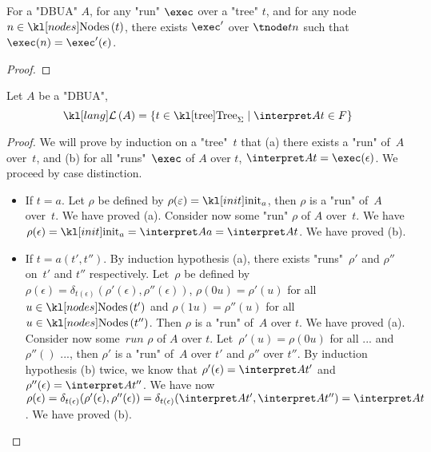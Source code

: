 \documentclass{article}
\begin{document}
\begin{lemma}\label{lem:exec-sub}
	For a "DBUA" $A$, for any "run" $\exec$ over a "tree" $t$, and for any node $n \in \nodes t$, there exists $\exec'$ over
	$\tnode t n$ such that $\exec (n) = \exec'(\epsilon)$.
\end{lemma}

\begin{proof}
	\todo{~}
\end{proof}

\begin{lemma}
	Let $A$ be a "DBUA",
	\[ \lang A = \setdef {t \in \tree_{\Sigma}} {\interpret A t \in F} \]
\end{lemma}

\begin{proof}
	We will prove by induction on a "tree"~$t$ that (a) there exists a "run" of~$A$ over~$t$, and (b) for all "runs"~$\exec$ of $A$ over $t$, $\interpret A t = \exec (\epsilon)$.
	We proceed by case distinction.
	\begin{itemize}
		\item If $t = a$. Let $\rho$ be defined by $\rho(\varepsilon)=\init_a$, then $\rho$ is a "run" of~$A$ over~$t$. We have proved (a).
		      Consider now some "run" $\rho$ of $A$ over~$t$. We have $\rho(\epsilon)=\init_a=\interpret A a=\interpret A t$. We have proved  (b).
		\item If $t = a(t',t'')$. By induction hypothesis (a), there exists "runs"~$\rho'$ and $\rho''$ on~$t'$ and $t''$ respectively.
		      Let~$\rho$ be defined by $\rho(\epsilon)=\delta_{t(\epsilon)}(\rho'(\epsilon),\rho''(\epsilon))$,
		      $\rho(0u)=\rho'(u)$ for all $u\in\nodes{t'}$ and $\rho(1u)=\rho''(u)$ for all~$u\in \nodes{t''}$. Then $\rho$ is a "run" of~$A$ over $t$. We have proved (a).
		      Consider now some~$run$ $\rho$ of $A$ over $t$. Let~$\rho'(u)=\rho(0u)$ for all ... and $\rho''()$ ...,
		      then $\rho'$ is a "run" of~$A$ over $t'$ and $\rho''$ over $t''$. By induction hypothesis (b) twice, we know that $\rho'(\epsilon)=\interpret A {t'}$ and $\rho''(\epsilon)=\interpret A {t''}$.
		      We have now $\rho(\epsilon) = \delta_{t(\epsilon)}(\rho'(\epsilon),\rho''(\epsilon)) = \delta_{t(\epsilon)}(\interpret A {t'},\interpret A {t''}) = \interpret A t$. We have proved (b).
	\end{itemize}
\end{proof}
\end{document}
